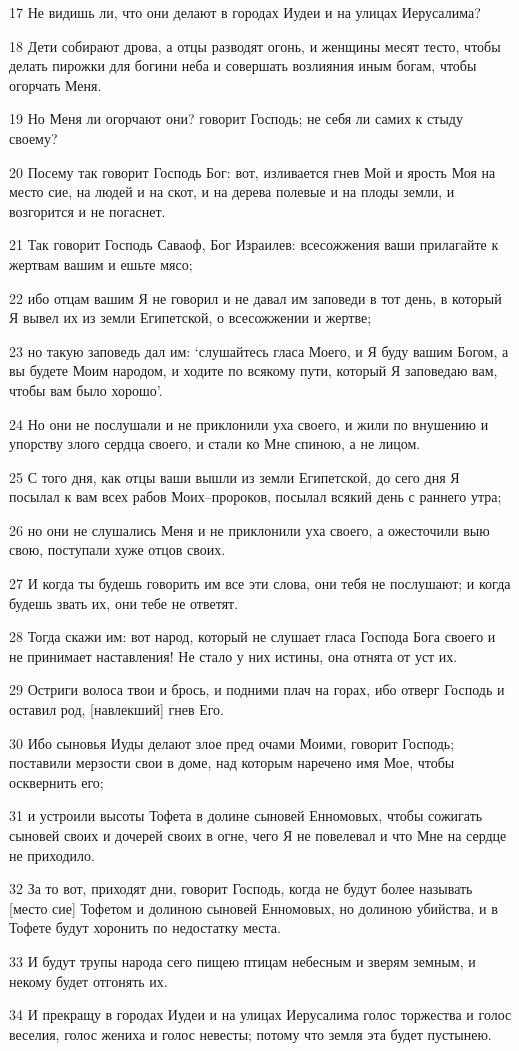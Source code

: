 \par 17 Не видишь ли, что они делают в городах Иудеи и на улицах Иерусалима?
\par 18 Дети собирают дрова, а отцы разводят огонь, и женщины месят тесто, чтобы делать пирожки для богини неба и совершать возлияния иным богам, чтобы огорчать Меня.
\par 19 Но Меня ли огорчают они? говорит Господь; не себя ли самих к стыду своему?
\par 20 Посему так говорит Господь Бог: вот, изливается гнев Мой и ярость Моя на место сие, на людей и на скот, и на дерева полевые и на плоды земли, и возгорится и не погаснет.
\par 21 Так говорит Господь Саваоф, Бог Израилев: всесожжения ваши прилагайте к жертвам вашим и ешьте мясо;
\par 22 ибо отцам вашим Я не говорил и не давал им заповеди в тот день, в который Я вывел их из земли Египетской, о всесожжении и жертве;
\par 23 но такую заповедь дал им: `слушайтесь гласа Моего, и Я буду вашим Богом, а вы будете Моим народом, и ходите по всякому пути, который Я заповедаю вам, чтобы вам было хорошо'.
\par 24 Но они не послушали и не приклонили уха своего, и жили по внушению и упорству злого сердца своего, и стали ко Мне спиною, а не лицом.
\par 25 С того дня, как отцы ваши вышли из земли Египетской, до сего дня Я посылал к вам всех рабов Моих--пророков, посылал всякий день с раннего утра;
\par 26 но они не слушались Меня и не приклонили уха своего, а ожесточили выю свою, поступали хуже отцов своих.
\par 27 И когда ты будешь говорить им все эти слова, они тебя не послушают; и когда будешь звать их, они тебе не ответят.
\par 28 Тогда скажи им: вот народ, который не слушает гласа Господа Бога своего и не принимает наставления! Не стало у них истины, она отнята от уст их.
\par 29 Остриги волоса твои и брось, и подними плач на горах, ибо отверг Господь и оставил род, [навлекший] гнев Его.
\par 30 Ибо сыновья Иуды делают злое пред очами Моими, говорит Господь; поставили мерзости свои в доме, над которым наречено имя Мое, чтобы осквернить его;
\par 31 и устроили высоты Тофета в долине сыновей Енномовых, чтобы сожигать сыновей своих и дочерей своих в огне, чего Я не повелевал и что Мне на сердце не приходило.
\par 32 За то вот, приходят дни, говорит Господь, когда не будут более называть [место сие] Тофетом и долиною сыновей Енномовых, но долиною убийства, и в Тофете будут хоронить по недостатку места.
\par 33 И будут трупы народа сего пищею птицам небесным и зверям земным, и некому будет отгонять их.
\par 34 И прекращу в городах Иудеи и на улицах Иерусалима голос торжества и голос веселия, голос жениха и голос невесты; потому что земля эта будет пустынею.

